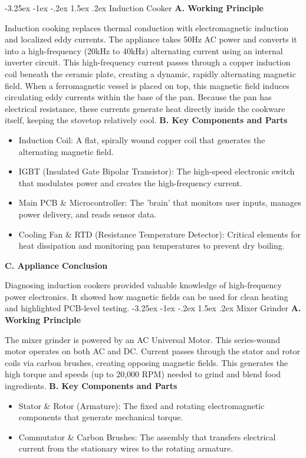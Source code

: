 \documentclass[11pt,a4paper]{report}
\makeatletter
\renewcommand{\section}{\@startsection{section}{1}{\z@}%
  {-3.25ex \@plus -1ex \@minus -.2ex}%
  {1.5ex \@plus.2ex}%
  {\normalfont\Large\bfseries\color{primaryColor}}}
\makeatother
\begin{document}
\section{Induction Cooker}
\noindent\textbf{A. Working Principle}\par\medskip
Induction cooking replaces thermal conduction with electromagnetic induction and localized eddy currents. The appliance takes 50Hz AC power and converts it into a high-frequency (20kHz to 40kHz) alternating current using an internal inverter circuit. This high-frequency current passes through a copper induction coil beneath the ceramic plate, creating a dynamic, rapidly alternating magnetic field. When a ferromagnetic vessel is placed on top, this magnetic field induces circulating eddy currents within the base of the pan. Because the pan has electrical resistance, these currents generate heat directly inside the cookware itself, keeping the stovetop relatively cool.
\noindent\textbf{B. Key Components and Parts}\par\medskip
\begin{itemize}
  \item Induction Coil: A flat, spirally wound copper coil that generates the alternating magnetic field.
  \item IGBT (Insulated Gate Bipolar Transistor): The high-speed electronic switch that modulates power and creates the high-frequency current.
  \item Main PCB \& Microcontroller: The 'brain' that monitors user inputs, manages power delivery, and reads sensor data.
  \item Cooling Fan \& RTD (Resistance Temperature Detector): Critical elements for heat dissipation and monitoring pan temperatures to prevent dry boiling.
\end{itemize}
\noindent\textbf{C. Appliance Conclusion}\par\medskip
Diagnosing induction cookers provided valuable knowledge of high-frequency power electronics. It showed how magnetic fields can be used for clean heating and highlighted PCB-level testing.
\section{Mixer Grinder}
\noindent\textbf{A. Working Principle}\par\medskip
The mixer grinder is powered by an AC Universal Motor. This series-wound motor operates on both AC and DC. Current passes through the stator and rotor coils via carbon brushes, creating opposing magnetic fields. This generates the high torque and speeds (up to 20,000 RPM) needed to grind and blend food ingredients.
\noindent\textbf{B. Key Components and Parts}\par\medskip
\begin{itemize}
  \item Stator \& Rotor (Armature): The fixed and rotating electromagnetic components that generate mechanical torque.
  \item Commutator \& Carbon Brushes: The assembly that transfers electrical current from the stationary wires to the rotating armature.
\end{itemize}
\end{document}

